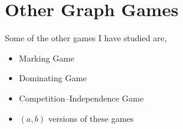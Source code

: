 \documentclass{beamer}
\begin{document}
\section{Other Graph Games}


\begin{frame}{\secname}
    
    Some of the other games I have studied are,
    \begin{itemize}
        \item Marking Game
        \item Dominating Game
        \item Competition--Independence Game
        \item $(a,b)$ versions of these games
    \end{itemize}
    
\end{frame}
\end{document}

